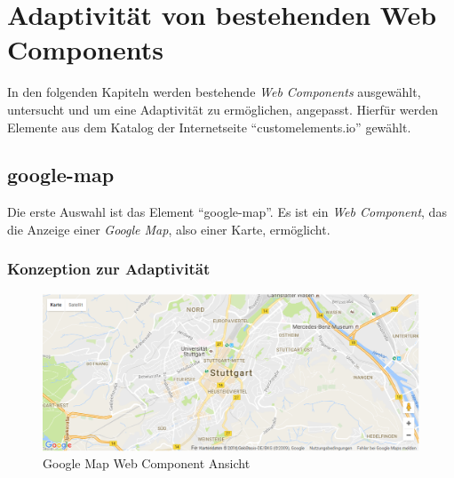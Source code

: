 \documentclass[12pt, paper=a4, bibtotoc, toc=listof, headsepline=true]{scrreprt}
\begin{document}
\chapter{Adaptivität von bestehenden Web Components}
	In den folgenden Kapiteln werden bestehende \emph{Web Components} ausgewählt, untersucht und um eine Adaptivität zu ermöglichen, angepasst. Hierfür werden Elemente aus dem Katalog der Internetseite \enquote{customelements.io} gewählt\cite{cusEleIo}.
		\section{google-map}
			Die erste Auswahl ist das Element \enquote{google-map}. Es ist ein \emph{Web Component}, das die Anzeige einer \emph{Google Map}, also einer Karte, ermöglicht\cite{gooMap}.
			\subsection{Konzeption zur Adaptivität}
			\label{ref:konVonAda}
			\begin{figure}				\centering
				\includegraphics[width=\textwidth,height=\textheight,keepaspectratio]{gmap.png}
				\caption[Google Map Web Component]{Google Map Web Component Ansicht}
				\label{img:gmap}
			\end{figure}
\end{document}
